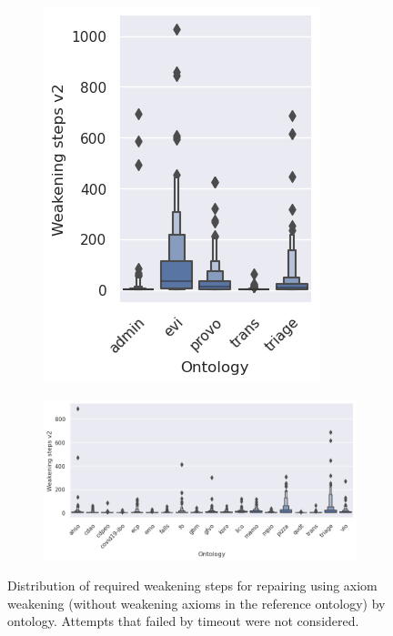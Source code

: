 \begin{figure}[htbp]
  \centering
  \begin{subfigure}[T]{0.25\textwidth}
    \includegraphics[width=\textwidth]{resources/steps-enhance-ontology-violin-1.png}
  \end{subfigure}
  \begin{subfigure}[T]{0.715\textwidth}
    \includegraphics[width=\textwidth]{resources/steps-enhance-ontology-violin-2.png}
  \end{subfigure}
  \caption{Distribution of required weakening steps for repairing using axiom weakening (without weakening axioms in the reference ontology) by ontology. Attempts that failed by timeout were not considered.}
\end{figure}

